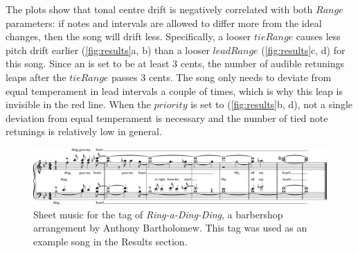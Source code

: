 \documentclass[a4paper]{article}
\begin{document}
The plots show that tonal centre drift is negatively correlated with both $\mathit{Range}$ parameters: if notes and intervals are allowed to differ more from the ideal changes, then the song will drift less. Specifically, a looser $\mathit{tieRange}$ causes less pitch drift earlier (\ref{fig:results}a, b) than a looser $\mathit{leadRange}$ (\ref{fig:results}c, d) for this song. Since an  is set to be at least 3 cents, the number of audible retunings leaps after the $\mathit{tieRange}$ passes 3 cents. The song only needs to deviate from equal temperament in lead intervals a couple of times, which is why this leap is invisible in the red line. When the $\mathit{priority}$ is set to  (\ref{fig:results}b, d), not a single deviation from equal temperament is necessary and the number of tied note retunings is relatively low in general.

\begin{figure}
	\centering
	\includegraphics[width=\linewidth]{Figures/Ding_MuseScore.pdf}
	\caption{Sheet music for the tag of \textit{Ring-a-Ding-Ding}, a barbershop arrangement by Anthony Bartholomew. This tag was used as an example song in the Results section.}
	\label{fig:ding_sheets}
\end{figure}
\end{document}
